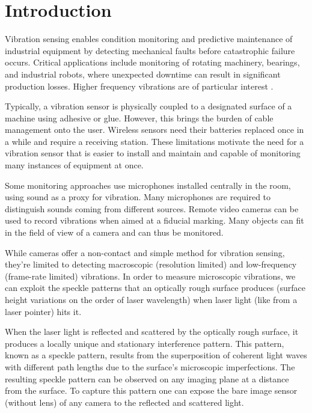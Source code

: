\section{Introduction}
\label{sec:intro}

Vibration sensing enables condition monitoring and predictive maintenance of industrial equipment by detecting mechanical faults before catastrophic failure occurs. 
Critical applications include monitoring of rotating machinery, bearings, and industrial robots, where unexpected downtime can result in significant production losses. 
Higher frequency vibrations are of particular interest \cite{cm-highfreq}.

Typically, a vibration sensor is physically coupled to a designated surface of a machine using adhesive or glue. 
However, this brings the burden of cable management onto the user. Wireless sensors need their batteries replaced once in a while and require a receiving station. 
These limitations motivate the need for a vibration sensor that is easier to install and maintain and capable of monitoring many instances of equipment at once.

Some monitoring approaches use microphones installed centrally in the room, using sound as a proxy for vibration. 
Many microphones are required to distinguish sounds coming from different sources. Remote video cameras can be used to record vibrations \cite{camvibration} when aimed at a fiducial marking. 
Many objects can fit in the field of view of a camera and can thus be monitored. 

While cameras offer a non-contact and simple method for vibration sensing, they're limited to detecting macroscopic (resolution limited) and low-frequency (frame-rate limited) vibrations.
In order to measure microscopic vibrations, we can exploit the speckle patterns that an optically rough surface produces (surface height variations on the order of laser wavelength) 
when laser light (like from a laser pointer) hits it.

When the laser light is reflected and scattered by the optically rough surface, it produces a locally unique and stationary interference pattern. 
This pattern, known as a speckle pattern, results from the superposition of coherent light waves with different path lengths due to the surface's microscopic imperfections. 
The resulting speckle pattern can be observed on any imaging plane at a distance from the surface. To capture this pattern one can expose the bare image sensor (without lens) 
of any camera to the reflected and scattered light.

